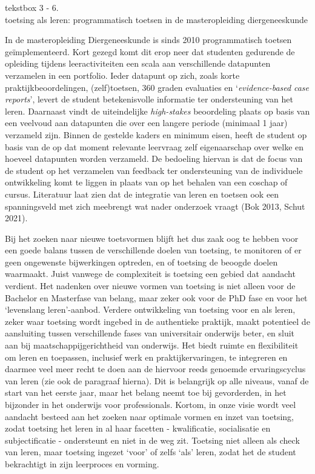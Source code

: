 \documentclass[empirical, authordate, ]{new-jote-article}
\begin{document}
	\begin{bookbox}{\raggedright tekstbox 3 - 6. \\toetsing als leren: programmatisch toetsen in de masteropleiding diergeneeskunde}
		In de masteropleiding Diergeneeskunde is sinds 2010 programmatisch toetsen geïmplementeerd. Kort gezegd komt dit erop neer dat studenten gedurende de opleiding tijdens leeractiviteiten een scala aan verschillende datapunten verzamelen in een portfolio. Ieder datapunt op zich, zoals korte praktijkbeoordelingen, (zelf)toetsen, 360 graden evaluaties en ‘\emph{evidence-based}\emph{ case }\emph{reports}', levert de student betekenisvolle informatie ter ondersteuning van het leren. Daarnaast vindt de uiteindelijke \emph{high-}\emph{stakes} beoordeling plaats op basis van een veelvoud aan datapunten die over een langere periode (minimaal 1 jaar) verzameld zijn. Binnen de gestelde kaders en minimum eisen, heeft de student op basis van de op dat moment relevante leervraag zelf eigenaarschap over welke en hoeveel datapunten worden verzameld. De bedoeling hiervan is dat de focus van de student op het verzamelen van feedback ter ondersteuning van de individuele ontwikkeling komt te liggen in plaats van op het behalen van een coschap of cursus. Literatuur laat zien dat de integratie van leren en toetsen ook een spanningsveld met zich meebrengt wat nader onderzoek vraagt (Bok 2013, Schut 2021).\emph{ }
	\end{bookbox}

	Bij het zoeken naar nieuwe toetsvormen blijft het dus zaak oog te hebben voor een goede balans tussen de verschillende doelen van toetsing, te monitoren of er geen ongewenste bijwerkingen optreden, en of toetsing de beoogde doelen waarmaakt. Juist vanwege de complexiteit is toetsing een gebied dat aandacht verdient. Het nadenken over nieuwe vormen van toetsing is niet alleen voor de Bachelor en Masterfase van belang, maar zeker ook voor de PhD fase en voor het ‘levenslang leren'-aanbod. Verdere ontwikkeling van toetsing voor en als leren, zeker waar toetsing wordt ingebed in de authentieke praktijk, maakt potentieel de aansluiting tussen verschillende fases van universitair onderwijs beter, en sluit aan bij maatschappijgerichtheid van onderwijs. Het biedt ruimte en flexibiliteit om leren en toepassen, inclusief werk en praktijkervaringen, te integreren en daarmee veel meer recht te doen aan de hiervoor reeds genoemde ervaringscyclus van leren (zie ook de paragraaf hierna). Dit is belangrijk op alle niveaus, vanaf de start van het eerste jaar, maar het belang neemt toe bij gevorderden, in het bijzonder in het onderwijs voor professionals. Kortom, in onze visie wordt veel aandacht besteed aan het zoeken naar optimale vormen en inzet van toetsing, zodat toetsing het leren in al haar facetten - kwalificatie, socialisatie en subjectificatie - ondersteunt en niet in de weg zit. Toetsing niet alleen als check van leren, maar toetsing ingezet ‘voor' of zelfs ‘als' leren, zodat het de student bekrachtigt in zijn leerproces en vorming.
\end{document}

